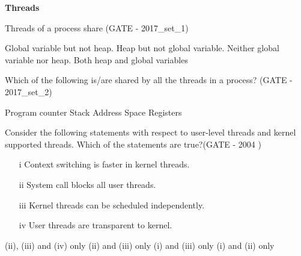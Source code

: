 \centerline{\textbf{ \LARGE Threads}}



\begin{questyle}

  \question  Threads of a process share (GATE - 2017\_set\_1)

  \begin{choices}
    \choice Global variable but not heap.
    \choice Heap but not global variable.
    \choice Neither global variable nor heap.
    \CorrectChoice Both heap and global variables
  \end{choices}


  \end{questyle}





\begin{questyle}

  \question  Which of the following is/are shared by all the threads in a process? (GATE - 2017\_set\_2)
    \begin{oneparchoices}
      \choice Program counter
      \choice Stack
      \CorrectChoice Address Space
      \choice Registers
    \end{oneparchoices}


  \end{questyle}





\begin{questyle}

  \question Consider the following statements with respect to user-level threads and
            kernel supported threads. Which of the statements are true?(GATE - 2004 )

    \begin{enumerate}
      \item[i] Context switching is faster in kernel threads.
      \item[ii] System call blocks all user threads.
      \item[iii] Kernel threads can be scheduled independently.
      \item[iv] User threads are transparent to kernel.
    \end{enumerate}

  \begin{oneparchoices}
    \CorrectChoice (ii), (iii) and (iv) only
    \choice (ii) and (iii) only
    \choice (i) and (iii) only
    \choice (i) and (ii) only
  \end{oneparchoices}


  \end{questyle}



